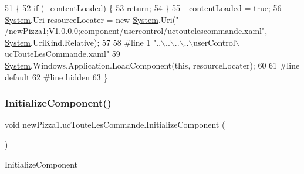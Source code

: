 \begin{DoxyCode}
51                                           \{
52             \textcolor{keywordflow}{if} (\_contentLoaded) \{
53                 \textcolor{keywordflow}{return};
54             \}
55             \_contentLoaded = \textcolor{keyword}{true};
56             \hyperlink{namespaceSystem}{System}.Uri resourceLocater = \textcolor{keyword}{new} \hyperlink{namespaceSystem}{System}.Uri(\textcolor{stringliteral}{"
      /newPizza1;V1.0.0.0;component/usercontrol/uctoutelescommande.xaml"}, \hyperlink{namespaceSystem}{System}.UriKind.Relative);
57             
58 \textcolor{preprocessor}{            #line 1 "..\(\backslash\)..\(\backslash\)..\(\backslash\)..\(\backslash\)userControl\(\backslash\)ucTouteLesCommande.xaml"}
59             \hyperlink{namespaceSystem}{System}.Windows.Application.LoadComponent(\textcolor{keyword}{this}, resourceLocater);
60             
61 \textcolor{preprocessor}{            #line default}
62 \textcolor{preprocessor}{            #line hidden}
63         \}
\end{DoxyCode}
\mbox{\label{classnewPizza1_1_1ucTouteLesCommande_a8349ab5709ac09dd8c7e3f8d2cc0b633}} 
\subsubsection{\texorpdfstring{Initialize\+Component()}{InitializeComponent()}\hspace{0.1cm}{\footnotesize\ttfamily [5/6]}}
{\footnotesize\ttfamily void new\+Pizza1.\+uc\+Toute\+Les\+Commande.\+Initialize\+Component (\begin{DoxyParamCaption}{ }\end{DoxyParamCaption})\hspace{0.3cm}{\ttfamily [inline]}}



Initialize\+Component 


